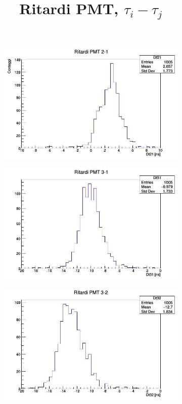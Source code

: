 \documentclass[a4paper]{article}
\begin{document}
\begin{figure}[H]
\centering
\title{Ritardi PMT, $\tau_i - \tau _j$}
\begin{center}
\begin{subfigure}[b]{0.32\textwidth}
\includegraphics[width=\textwidth]{./immagini/TimeOfFlight/Rit21Fore.jpg}
\caption{}
\label{fig:Dt21Fore}
\end{subfigure}
\hfill
\begin{subfigure}[b]{0.32\textwidth}
\includegraphics[width=\textwidth]{./immagini/TimeOfFlight/Rit31Fore.jpg}
\caption{}
\label{fig:Dt31Fore}
\end{subfigure}
\hfill
\begin{subfigure}[b]{0.32\textwidth}
\includegraphics[width=\textwidth]{./immagini/TimeOfFlight/Rit32Fore.jpg}

\end{subfigure}
\end{center}
\end{figure}
\end{document}
